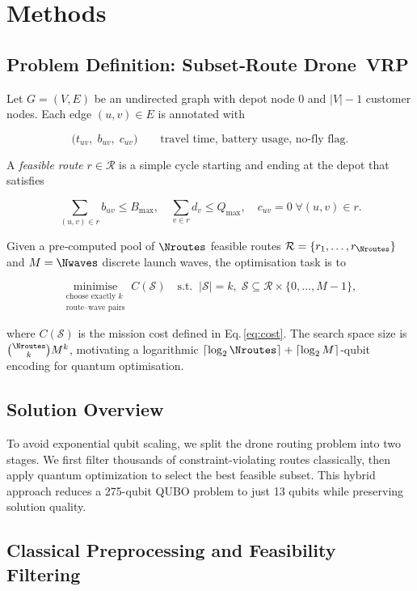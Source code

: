 \section{Methods}

\subsection{Problem Definition: Subset‑Route Drone VRP}
\label{sec:problem}

Let $G=(V,E)$ be an undirected graph with depot node $0$ and
$|V|-1$ customer nodes.  Each edge $(u,v)\in E$ is annotated with

\[
\bigl(t_{uv}, \; b_{uv}, \; c_{uv}\bigr)
\qquad
\text{travel time, battery usage, no‑fly flag.}
\]

A \emph{feasible route} $r\in\mathcal{R}$ is a simple cycle starting and
ending at the depot that satisfies

\[
\textstyle
\sum_{(u,v)\in r} b_{uv} \le B_{\max},
\quad
\sum_{v\in r} d_v \le Q_{\max},
\quad
c_{uv}=0 \;\forall(u,v)\in r.
\]

Given a pre‑computed pool of $\Nroutes$ feasible routes
$\mathcal{R}=\{r_1,\dots,r_{\Nroutes}\}$ and $M=\Nwaves$ discrete launch
waves, the optimisation task is to

\[
\underset{
    \substack{\text{choose exactly }k\\ \text{route–wave pairs}}}
    {\text{minimise}}
\; C(\mathcal{S})
\quad
\text{s.t.}
\;\;
|\mathcal{S}|=k,\;
\mathcal{S}\subseteq\mathcal{R}\times\{0,\dots,M-1\},
\]

where $C(\mathcal{S})$ is the mission cost defined in
Eq.\,\eqref{eq:cost}.  The search space size is
${\small\binom{\Nroutes}{k} M^{k}}$, motivating a logarithmic
$\lceil\log_2\Nroutes\rceil+\lceil\log_2 M\rceil$‑qubit encoding for
quantum optimisation.


\subsection{Solution Overview}

To avoid exponential qubit scaling, we split the drone routing problem into two stages. We first filter thousands of constraint-violating routes classically, then apply quantum optimization to select the best feasible subset. This hybrid approach reduces a 275-qubit QUBO problem to just 13 qubits while preserving solution quality.

\subsection{Classical Preprocessing and Feasibility Filtering}

